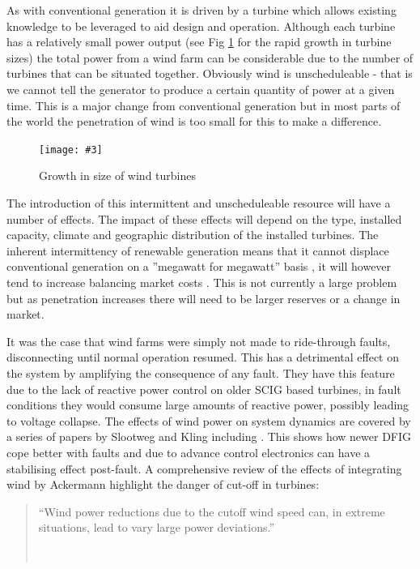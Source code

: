 \documentclass[a4paper,oneside,12pt]{report}
\newcommand{\image}[3] {
  \begin{figure}
    \begin{center}
      \texttt{[image: \#3]}
      \caption{#2}
      \label{#1}
    \end{center}
  \end{figure}
}
\newcommand{\tmpquotecite}{}%
\newenvironment{myquote}[1][]
{\renewcommand{\tmpquotecite}{#1}\begin{quote}\begin{itshape}``}
{''\end{itshape}~{\normalfont~\tmpquotecite}\end{quote}}
\begin{document}
As with conventional generation it is driven by a turbine which allows existing knowledge to be leveraged to aid design and operation. Although each turbine has a relatively small power output (see Fig \ref{HistoricBladeSize} for the rapid growth in turbine sizes) the total power from a wind farm can be considerable due to the number of turbines that can be situated together. Obviously wind is unscheduleable - that is we cannot tell the generator to produce a certain quantity of power at a given time. This is a major change from conventional generation but in most parts of the world the penetration of wind is too small for this to make a difference.

\image{HistoricBladeSize}{Growth in size of wind turbines \cite{BWEA2005f}}{windhubheight.png}

The introduction of this intermittent and unscheduleable resource will have a number of effects. The impact of these effects will depend on the type, installed capacity, climate and geographic distribution of the installed turbines. The inherent intermittency of renewable generation means that it cannot displace conventional generation on a ''megawatt for megawatt'' basis \cite{Strbac2007}, it will however tend to increase balancing market costs \cite{Ford2005}. This is not currently a large problem but as penetration increases there will need to be larger reserves or a change in market.

It was the case that wind farms were simply not made to ride-through faults, disconnecting until normal operation resumed. This has a detrimental effect on the system by amplifying the consequence of any fault. They have this feature due to the lack of reactive power control on older SCIG based turbines, in fault conditions they would consume large amounts of reactive power, possibly leading to voltage collapse. The effects of wind power on system dynamics are covered by a series of papers by Slootweg and Kling including \cite{Slootweg2002}. This shows how newer DFIG cope better with faults and due to advance control electronics can have a stabilising effect post-fault. A comprehensive review of the effects of integrating wind by Ackermann \cite{Ackermann2005} highlight the danger of cut-off in turbines:

\begin{myquote}[\cite{Ackermann2005}]Wind power reductions due to the cutoff wind speed can, in extreme situations, lead to vary large power deviations.\end{myquote}
\end{document}
